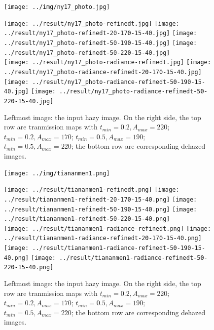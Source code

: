 \documentclass{article}
\begin{document}
\begin{figure}[H]
    \centering
    \begin{minipage}[b]{0.319\linewidth}
        \centering
        \texttt{[image: ../img/ny17\_photo.jpg]}
    \end{minipage}
    \begin{minipage}[b]{0.66\linewidth}
       \centering
        \texttt{[image: ../result/ny17\_photo-refinedt.jpg]}
        \texttt{[image: ../result/ny17\_photo-refinedt-20-170-15-40.jpg]}
        \texttt{[image: ../result/ny17\_photo-refinedt-50-190-15-40.jpg]}
        \texttt{[image: ../result/ny17\_photo-refinedt-50-220-15-40.jpg]}
        \\
        \texttt{[image: ../result/ny17\_photo-radiance-refinedt.jpg]}
        \texttt{[image: ../result/ny17\_photo-radiance-refinedt-20-170-15-40.jpg]}
        \texttt{[image: ../result/ny17\_photo-radiance-refinedt-50-190-15-40.jpg]}
        \texttt{[image: ../result/ny17\_photo-radiance-refinedt-50-220-15-40.jpg]}
    \end{minipage}
    
    \captionsetup{singlelinecheck=off}
    \caption{Leftmost image: the input hazy image. On the right side, the top row are tranmission maps with
        $t_{min} = 0.2, A_{max} = 220$;
        $t_{min} = 0.2, A_{max} = 170$;
        $t_{min} = 0.5, A_{max} = 190$;
        $t_{min} = 0.5, A_{max} = 220$;
        the bottom row are corresponding dehazed images.
    }
    \label{fig:sp3}
\end{figure}

\begin{figure}[H]
    \centering
    \begin{minipage}[b]{0.319\linewidth}
        \centering
        \texttt{[image: ../img/tiananmen1.png]}
    \end{minipage}
    \begin{minipage}[b]{0.66\linewidth}
       \centering
        \texttt{[image: ../result/tiananmen1-refinedt.png]}
        \texttt{[image: ../result/tiananmen1-refinedt-20-170-15-40.png]}
        \texttt{[image: ../result/tiananmen1-refinedt-50-190-15-40.png]}
        \texttt{[image: ../result/tiananmen1-refinedt-50-220-15-40.png]}
        \\
        \texttt{[image: ../result/tiananmen1-radiance-refinedt.png]}
        \texttt{[image: ../result/tiananmen1-radiance-refinedt-20-170-15-40.png]}
        \texttt{[image: ../result/tiananmen1-radiance-refinedt-50-190-15-40.png]}
        \texttt{[image: ../result/tiananmen1-radiance-refinedt-50-220-15-40.png]}
    \end{minipage}
   
    \captionsetup{singlelinecheck=off}
    \caption{Leftmost image: the input hazy image. On the right side, the top row are tranmission maps with
        $t_{min} = 0.2, A_{max} = 220$;
        $t_{min} = 0.2, A_{max} = 170$;
        $t_{min} = 0.5, A_{max} = 190$;
        $t_{min} = 0.5, A_{max} = 220$;
        the bottom row are corresponding dehazed images.
    }
     \label{fig:sp4}
\end{figure}



\end{document}
